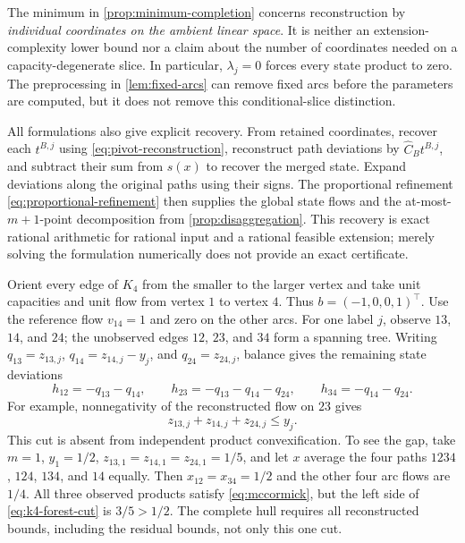 The minimum in \cref{prop:minimum-completion} concerns reconstruction by
\emph{individual coordinates on the ambient linear space}. It is neither
an extension-complexity lower bound nor a claim about the number of
coordinates needed on a capacity-degenerate slice. In particular,
$\lambda_j=0$ forces every state product to zero. The preprocessing in
\cref{lem:fixed-arcs} can remove fixed arcs before the parameters are
computed, but it does not remove this conditional-slice distinction.

All formulations also give explicit recovery. From retained coordinates,
recover each $t^{B,j}$ using \eqref{eq:pivot-reconstruction}, reconstruct
path deviations by $\widehat C_Bt^{B,j}$, and subtract their sum from
$s(x)$ to recover the merged state. Expand deviations along the original
paths using their signs. The proportional refinement
\eqref{eq:proportional-refinement} then supplies the global state flows
and the at-most-$m+1$-point decomposition from
\cref{prop:disaggregation}. This recovery is exact rational arithmetic for
rational input and a rational feasible extension; merely solving the
formulation numerically does not provide an exact certificate.

\begin{example}\label{ex:forest-k4}
Orient every edge of $K_4$ from the smaller to the larger vertex and take
unit capacities and unit flow from vertex $1$ to vertex $4$. Thus
$b=(-1,0,0,1)^\top$. Use the reference flow $v_{14}=1$ and zero on the
other arcs. For one label $j$, observe $13$, $14$, and $24$; the unobserved
edges $12$, $23$, and $34$ form a spanning tree. Writing
$q_{13}=z_{13,j}$, $q_{14}=z_{14,j}-y_j$, and $q_{24}=z_{24,j}$, balance
gives the remaining state deviations
\[
 h_{12}=-q_{13}-q_{14},\qquad
 h_{23}=-q_{13}-q_{14}-q_{24},\qquad
 h_{34}=-q_{14}-q_{24}.
\]
For example, nonnegativity of the reconstructed flow on $23$ gives
\begin{equation}\label{eq:k4-forest-cut}
 z_{13,j}+z_{14,j}+z_{24,j}\le y_j.
\end{equation}
This cut is absent from independent product convexification. To see the
gap, take $m=1$, $y_1=1/2$, $z_{13,1}=z_{14,1}=z_{24,1}=1/5$, and let
$x$ average the four paths $1234$, $124$, $134$, and $14$ equally. Then
$x_{12}=x_{34}=1/2$ and the other four arc flows are $1/4$. All three
observed products satisfy \eqref{eq:mccormick}, but the left side of
\eqref{eq:k4-forest-cut} is $3/5>1/2$. The complete hull requires all
reconstructed bounds, including the residual bounds, not only this one cut.
\end{example}
